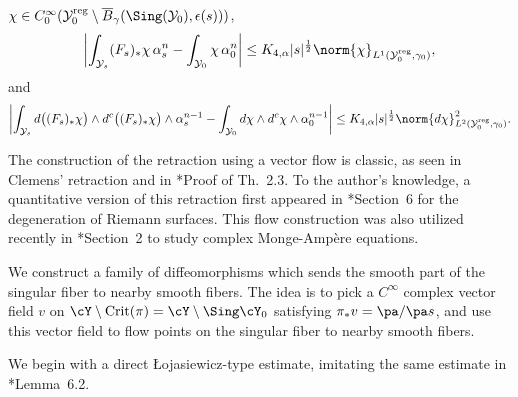 \documentclass[12pt]{amsart}
\begin{document}
\begin{proposition}
\begin{enumerate}
\(\chi \in C_{0}^{\infty}(\mathcal{Y}_{0}^{\mathrm{reg}} \setminus \overline{B}_{\gamma}(\Sing(\mathcal{Y}_{0}), \epsilon(s)))\),
\[
\left|
\int_{\mathcal{Y}_{s}} (F_{s})_{*}\chi \, \alpha_{s}^{n}
-
\int_{\mathcal{Y}_{0}} \chi \, \alpha_{0}^{n}
\right|
\le
K_{4,\alpha} |s|^{\frac{1}{2}} \norm{\chi}_{L^{1}(\mathcal{Y}_{0}^{\mathrm{reg}},\gamma_{0})},
\]
and
\[
\left|
\int_{\mathcal{Y}_{s}} d\bigl((F_{s})_{*}\chi\bigr) \wedge d^{c}\bigl((F_{s})_{*}\chi\bigr) \wedge \alpha_{s}^{n-1}
-
\int_{\mathcal{Y}_{0}} d\chi \wedge d^{c}\chi \wedge \alpha_{0}^{n-1}
\right|
\le
K_{4,\alpha} |s|^{\frac{1}{2}} \norm{d\chi}_{L^{2}(\mathcal{Y}_{0}^{\mathrm{reg}},\gamma_{0})}^{2}.
\]
\end{enumerate}
\end{proposition}

\begin{remark}
    The construction of the retraction using a vector flow is classic,
    as seen in Clemens' retraction \cites{Clemens1969,Clemens1977} and in \cite{Kodaira1986}*{Proof of Th.~2.3}. 
    To the author's knowledge, a quantitative version of this retraction first appeared
    in \cite{Dai-Yoshikawa2025}*{Section~6} 
    for the degeneration of Riemann surfaces.
    This flow construction was also utilized recently
    in \cite{CGP2021}*{Section~2}
    to study complex Monge-Amp\`ere equations.
\end{remark}

We construct a family of diffeomorphisms which sends
the smooth part of the singular fiber to nearby smooth fibers. 
The idea is to pick a \(C^\infty\) complex vector field \(v\) on \(\cY \setminus \mathrm{Crit}(\pi) = \cY \setminus \Sing \cY_0\) satisfying \(\pi_* v = \pa/\pa s\), and use this vector field to flow points on the singular fiber to nearby smooth fibers. 

We begin with a direct Łojasiewicz-type 
estimate, imitating the same estimate in 
\cite{Dai-Yoshikawa2025}*{Lemma~6.2}.

\end{document}
